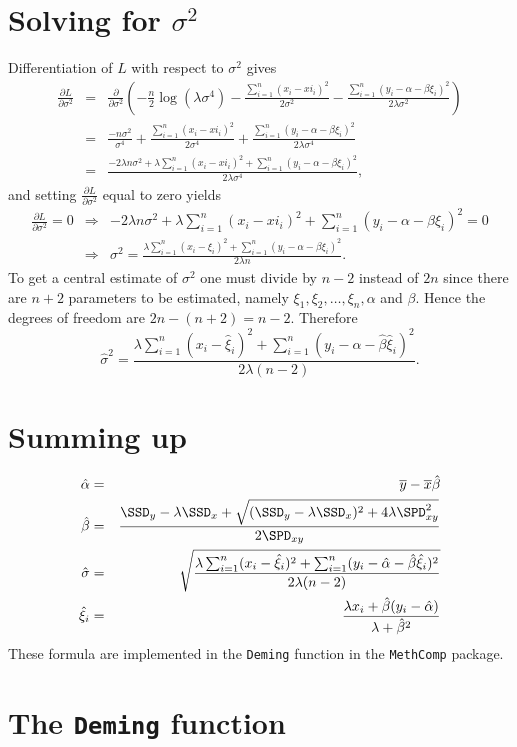 \documentclass[a4paper,twoside,12pt]{article}
\begin{document}

\section{Solving for $\sigma^2$}
Differentiation of $L$ with respect to $\sigma^2$ gives
\begin{eqnarray*}
\frac{\partial L}{\partial\sigma^2}
&=&
\frac{\partial}{\partial\sigma^2}\left(
-\frac{n}{2}\log(\lambda\sigma^4)-\frac{\sum_{i=1}^n(x_i-xi_i)^2}{2\sigma^2}-\frac{\sum_{i=1}^n(y_i-\alpha-\beta\xi_i)^2}{2\lambda\sigma^2}
\right)\\[1em]
&=&
\frac{-n\sigma^2}{\sigma^4}+\frac{\sum_{i=1}^n(x_i-xi_i)^2}{2\sigma^4}+\frac{\sum_{i=1}^n(y_i-\alpha-\beta\xi_i)^2}{2\lambda\sigma^4}\\[1em]
&=&
\frac{-2\lambda n\sigma^2+\lambda\sum_{i=1}^n(x_i-xi_i)^2+\sum_{i=1}^n(y_i-\alpha-\beta\xi_i)^2}{2\lambda\sigma^4},
\end{eqnarray*}
and setting $\frac{\partial L}{\partial \sigma^2}$ equal to zero yields
\begin{eqnarray*}
\frac{\partial L}{\partial \sigma^2}=0
&\Rightarrow&
-2\lambda n\sigma^2+\lambda\sum_{i=1}^n(x_i-xi_i)^2+\sum_{i=1}^n(y_i-\alpha-\beta\xi_i)^2=0\\[1em]
&\Rightarrow&
\sigma^2=\frac{\lambda\sum_{i=1}^n(x_i-\xi_i)^2+\sum_{i=1}^n(y_i-\alpha-\beta\xi_i)^2}{2\lambda n}.
\end{eqnarray*}
To get a central estimate of $\sigma^2$ one must divide by $n-2$
instead of $2n$ since there are $n+2$ parameters to be estimated,
namely $\xi_1,\xi_2,\ldots,\xi_n,\alpha$ and $\beta$. Hence the
degrees of freedom are $2n-(n+2)=n-2$. Therefore
$$
\hat{\sigma}^2=\frac{\lambda\sum_{i=1}^n(x_i-\hat{\xi}_i)^2+\sum_{i=1}^n(y_i-\hat{\alpha}-\hat{\beta}\hat{\xi}_i)^2}{2\lambda (n-2)}.
$$
\section{Summing up}
\begin{eqnarray*}
\hat{\alpha} &=& \overline{y}-\overline{x}\hat{\beta}\\
\hat{\beta}    &=& \frac{\SSD_y-\lambda\SSD_x+\sqrt{(\SSD_y-\lambda\SSD_x)^2+4\lambda\SPD_{xy}^2}}{2\SPD_{xy}}\\
\hat{\sigma}   &=& \sqrt{\frac{\lambda\sum_{i=1}^n(x_i-\hat{\xi}_i)^2+\sum_{i=1}^n(y_i-\hat{\alpha}-\hat{\beta}\hat{\xi}_i)^2}{2\lambda (n-2)}}\\
\hat{\xi}_i    &=& \frac{\lambda x_i+\hat{\beta}(y_i-\hat{\alpha})}{\lambda+\hat{\beta}^2}
\end{eqnarray*}
These formula are implemented in the \texttt{Deming} function in the \texttt{MethComp} package.
\clearpage
\section{The \texttt{Deming} function}
\end{document}
